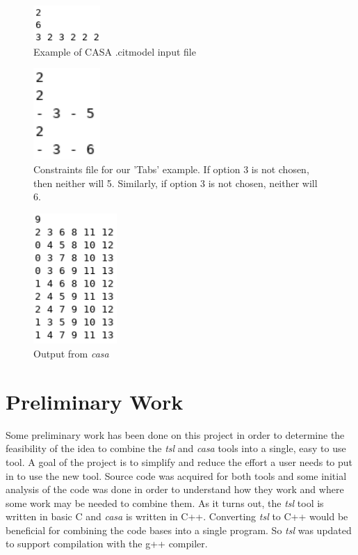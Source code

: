 \documentclass[a4full,12pt]{article}
\begin{document}
\begin{figure}[htb]
\centering
\includegraphics[width=1in,keepaspectratio]{images/casa_citmodel_input.png}
\caption{Example of CASA .citmodel input file}
\label{fig:casa_citmodel_input}
\end{figure}

\begin{figure}[htb]
\centering
\includegraphics[width=1in,keepaspectratio]{images/casa_constraints.png}
\caption{Constraints file for our 'Tabs' example. If option 3 is not chosen, then neither will 5. Similarly, if option 3 is not chosen, neither will 6.}
\label{fig:casa_constraints}
\end{figure}

\begin{figure}[htb]
\centering
\includegraphics[width=1.25in,keepaspectratio]{images/casa_output.png}
\caption{Output from \emph{casa}}
\label{fig:casa_output}
\end{figure}

\section{Preliminary Work}
Some preliminary work has been done on this project in order to determine the
  feasibility of the idea to combine the \emph{tsl} and \emph{casa} tools into 
  a single, easy to use tool. A goal of the project is to simplify and reduce the
  effort a user needs to put in to use the new tool. Source code was acquired for
  both tools and some initial analysis of the code was done in order to understand
  how they work and where some work may be needed to combine them. As it
  turns out, the \emph{tsl} tool is written in basic C and \emph{casa} is written
  in C++. Converting \emph{tsl} to C++ would be beneficial for combining the 
  code bases into a single program. So \emph{tsl} was updated to support compilation
  with the g++ compiler.
\end{document}
